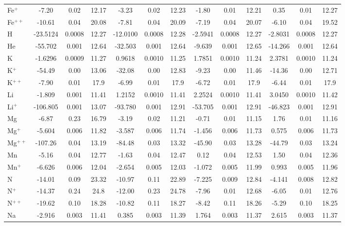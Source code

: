 \begin{longtable}{l!{\vrule width 0.25pt}ccc!{\vrule width 0.25pt}ccc!{\vrule width 0.25pt}ccc!{\vrule width 0.25pt}ccc}
Fe$^+$ & -7.20 & 0.02 & 12.17 & -3.23 & 0.02 & 12.23 & -1.80 & 0.01 & 12.21 & 0.35 & 0.01 & 12.27 \\
Fe$^{++}$ & -10.61 & 0.04 & 20.08 & -7.81 & 0.04 & 20.09 & -7.19 & 0.04 & 20.07 & -6.10 & 0.04 & 19.52 \\
H & -23.5124 & 0.0008 & 12.27 & -12.0100 & 0.0008 & 12.28 & -2.5941 & 0.0008 & 12.27 & -2.8031 & 0.0008 & 12.27 \\
He & -55.702 & 0.001 & 12.64 & -32.503 & 0.001 & 12.64 & -9.639 & 0.001 & 12.65 & -14.266 & 0.001 & 12.64 \\
K & -1.6296 & 0.0009 & 11.27 & 0.9618 & 0.0010 & 11.25 & 1.7851 & 0.0010 & 11.24 & 2.3781 & 0.0010 & 11.24 \\
K$^+$ & -54.49 & 0.00 & 13.06 & -32.08 & 0.00 & 12.83 & -9.23 & 0.00 & 11.46 & -14.36 & 0.00 & 12.71 \\
K$^{++}$ & -7.90 & 0.01 & 17.9 & -6.99 & 0.01 & 17.9 & -6.72 & 0.01 & 17.9 & -6.44 & 0.01 & 17.9 \\
Li & -1.809 & 0.001 & 11.41 & 1.2152 & 0.0010 & 11.41 & 2.2524 & 0.0010 & 11.41 & 3.0450 & 0.0010 & 11.42 \\
Li$^+$ & -106.805 & 0.001 & 13.07 & -93.780 & 0.001 & 12.91 & -53.705 & 0.001 & 12.91 & -46.823 & 0.001 & 12.91 \\
Mg & -6.87 & 0.23 & 16.79 & -3.19 & 0.02 & 11.21 & -0.71 & 0.01 & 11.15 & 1.76 & 0.01 & 11.16 \\
Mg$^+$ & -5.604 & 0.006 & 11.82 & -3.587 & 0.006 & 11.74 & -1.456 & 0.006 & 11.73 & 0.575 & 0.006 & 11.73 \\
Mg$^{++}$ & -107.26 & 0.04 & 13.19 & -84.48 & 0.03 & 13.32 & -45.90 & 0.03 & 13.28 & -44.79 & 0.03 & 13.24 \\
Mn & -5.16 & 0.04 & 12.77 & -1.63 & 0.04 & 12.47 & 0.12 & 0.04 & 12.53 & 1.50 & 0.04 & 12.36 \\
Mn$^+$ & -6.626 & 0.006 & 12.04 & -2.654 & 0.005 & 12.03 & -1.072 & 0.005 & 11.99 & 0.993 & 0.005 & 11.96 \\
N & -14.01 & 0.09 & 23.32 & -10.97 & 0.11 & 22.89 & -7.225 & 0.009 & 12.84 & -4.141 & 0.008 & 12.82 \\
N$^+$ & -14.37 & 0.24 & 24.8 & -12.00 & 0.23 & 24.78 & -7.96 & 0.01 & 12.68 & -6.05 & 0.01 & 12.76 \\
N$^{++}$ & -19.62 & 0.10 & 18.28 & -10.82 & 0.11 & 18.27 & -8.42 & 0.11 & 18.26 & -5.29 & 0.10 & 18.25 \\
Na & -2.916 & 0.003 & 11.41 & 0.385 & 0.003 & 11.39 & 1.764 & 0.003 & 11.37 & 2.615 & 0.003 & 11.37 \\

\end{longtable}
